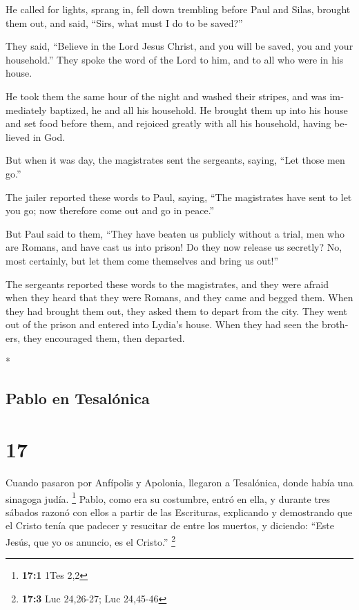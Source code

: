 \begin{paracol}{2}
\begin{otherlanguage}{english}
 He called for lights, sprang in, fell down trembling
before Paul and Silas,  brought them out, and said,
``Sirs, what must I do to be saved?''

 They said, ``Believe in the Lord Jesus Christ, and you
will be saved, you and your household.''  They spoke the
word of the Lord to him, and to all who were in his house.

 He took them the same hour of the night and washed their
stripes, and was immediately baptized, he and all his household.
 He brought them up into his house and set food before
them, and rejoiced greatly with all his household, having believed in
God.

 But when it was day, the magistrates sent the sergeants,
saying, ``Let those men go.''

 The jailer reported these words to Paul, saying, ``The
magistrates have sent to let you go; now therefore come out and go in
peace.''

 But Paul said to them, ``They have beaten us publicly
without a trial, men who are Romans, and have cast us into prison! Do
they now release us secretly? No, most certainly, but let them come
themselves and bring us out!''

 The sergeants reported these words to the magistrates,
and they were afraid when they heard that they were Romans,
 and they came and begged them. When they had brought
them out, they asked them to depart from the city.  They
went out of the prison and entered into Lydia's house. When they had
seen the brothers, they encouraged them, then departed.

\end{otherlanguage}

\switchcolumn[0]*

\hypertarget{pablo-en-tesaluxf3nica}{%
\subsection{Pablo en Tesalónica}\label{pablo-en-tesaluxf3nica}}

\hypertarget{section-32}{%
\section{17}\label{section-32}}

 Cuando pasaron por Anfípolis y Apolonia, llegaron a
Tesalónica, donde había una sinagoga judía. \footnote{\textbf{17:1} 1Tes
  2,2}  Pablo, como era su costumbre, entró en ella, y
durante tres sábados razonó con ellos a partir de las Escrituras,
 explicando y demostrando que el Cristo tenía que padecer
y resucitar de entre los muertos, y diciendo: ``Este Jesús, que yo os
anuncio, es el Cristo.'' \footnote{\textbf{17:3} Luc 24,26-27; Luc
  24,45-46}


\end{paracol}
